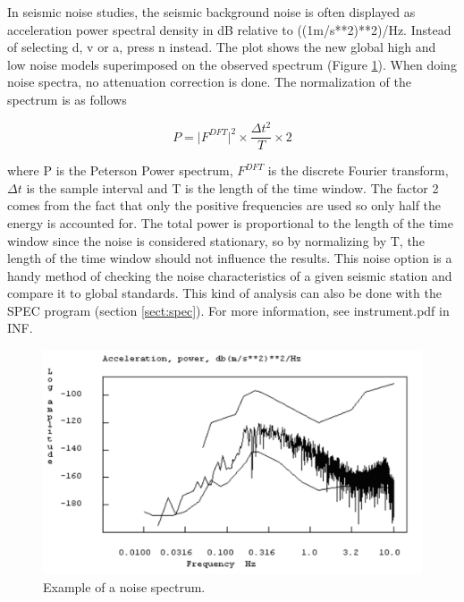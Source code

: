 In seismic noise studies, the seismic background noise is often displayed 
as acceleration power spectral density in dB relative to ((1m/s**2)**2)/Hz. 
Instead of selecting d, v or a, press n instead.  The plot shows the 
\citet{peterson1993}
 new global high and 
low noise models superimposed on the observed spectrum (Figure \ref{fig:noise-spec}). 
When doing noise spectra, no attenuation correction is done. The 
normalization of the spectrum is as follows 

\begin{displaymath}
P = \vert F^{DFT} \vert^{2} \times \frac{\Delta t^{2}}{T} \times 2
\end{displaymath}

where P is the Peterson Power spectrum, $F^{DFT}$ is the discrete 
Fourier transform, $\Delta t$ is the sample interval and T is the 
length of the time window. The factor 2 comes from the fact that 
only the positive frequencies are used so only half the energy is 
accounted for. The total power is proportional to the length of the 
time window since the noise is considered stationary, so by normalizing 
by T, the length of the time window should not influence the results. 
This noise option is a handy method of checking the noise characteristics 
of a given seismic station and compare it to global standards. This 
kind of analysis can also be done with the SPEC program 
(section \ref{sect:spec}). %
For more information, see instrument.pdf in INF. 

\begin{figure}
\centerline{\includegraphics[width=0.9\linewidth]{fig/fig23}}
\caption{Example of a noise spectrum.}
\label{fig:noise-spec}
\end{figure}


